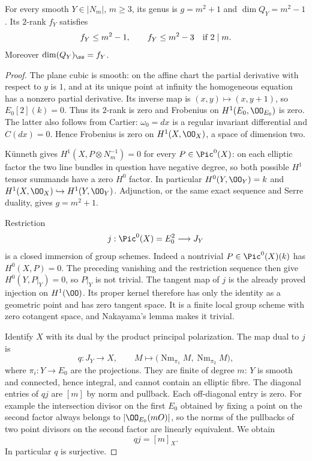 \begin{lemma}
\label{lem:DE-A3-ss-prym}
For every smooth $Y\in|N_m|$, $m\ge3$, its genus is $g=m^2+1$ and
$\dim Q_Y=m^2-1$.  Its $2$-rank $f_Y$ satisfies
\[
 f_Y\le m^2-1,
 \qquad
 f_Y\le m^2-3\quad\hbox{if }2\mid m.
\]
Moreover $\dim(Q_Y)_{\ss}=f_Y$.
\end{lemma}
\begin{proof}
The plane cubic is smooth: on the affine chart the partial derivative with
respect to $y$ is $1$, and at its unique point at infinity the homogeneous
equation has a nonzero partial derivative.  Its inverse map is
$(x,y)\mapsto(x,y+1)$, so $E_0[2](k)=0$.  Thus its $2$-rank is zero and
Frobenius on $H^1(E_0,\OO_{E_0})$ is zero.  The latter also follows from
Cartier: $\omega_0=dx$ is a regular invariant differential and
$C(dx)=0$.  Hence Frobenius is zero on $H^1(X,\OO_X)$, a space of
dimension two.

K\"unneth gives $H^1(X,P\otimes N_m^{-1})=0$ for every
$P\in\Pic^0(X)$: on each elliptic factor the two line bundles in question
have negative degree, so both possible $H^1$ tensor summands have a zero
$H^0$ factor.  In particular $H^0(Y,\OO_Y)=k$ and
$H^1(X,\OO_X)\hookrightarrow H^1(Y,\OO_Y)$.  Adjunction, or the same
exact sequence and Serre duality, gives $g=m^2+1$.

Restriction
\[
 j:\Pic^0(X)=E_0^2\longrightarrow J_Y
\]
is a closed immersion of group schemes.  Indeed a nontrivial
$P\in\Pic^0(X)(k)$ has $H^0(X,P)=0$.  The preceding vanishing and the
restriction sequence then give $H^0(Y,P|_Y)=0$, so $P|_Y$ is not trivial.
The tangent map of $j$ is the already proved injection on $H^1(\OO)$.
Its proper kernel therefore has only the identity as a geometric point and
has zero tangent space.  It is a finite local group scheme with zero
cotangent space, and Nakayama's lemma makes it trivial.

Identify $X$ with its dual by the product principal polarization.  The map
dual to $j$ is
\[
 q:J_Y\longrightarrow X,\qquad
 M\longmapsto
 \bigl(\operatorname{Nm}_{\pi_1}M,
       \operatorname{Nm}_{\pi_2}M\bigr),
\]
where $\pi_i:Y\to E_0$ are the projections.  They are finite of degree
$m$: $Y$ is smooth and connected, hence integral, and cannot contain an
elliptic fibre.  The diagonal entries of $qj$ are $[m]$ by norm and
pullback.  Each off-diagonal entry is zero.  For example the intersection
divisor on the first $E_0$ obtained by fixing a point on the second factor
always belongs to $|\OO_{E_0}(mO)|$, so the norms of the pullbacks of two
point divisors on the second factor are linearly equivalent.  We obtain
\[
 qj=[m]_X.                                                     \tag{\ast}
\]
In particular $q$ is surjective.


\end{proof}
